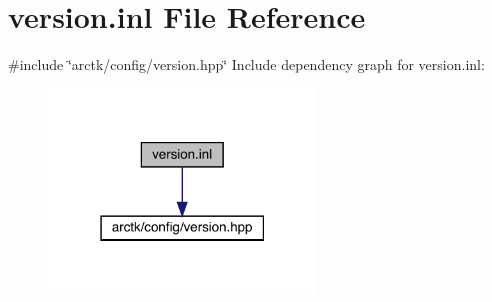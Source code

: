 \hypertarget{version_8inl}{}\section{version.\+inl File Reference}
\label{version_8inl}
{\ttfamily \#include \char`\"{}arctk/config/version.\+hpp\char`\"{}}\newline
Include dependency graph for version.\+inl\+:
\nopagebreak
\begin{figure}[H]
\begin{center}
\leavevmode
\includegraphics[width=202pt]{version_8inl__incl}
\end{center}
\end{figure}
